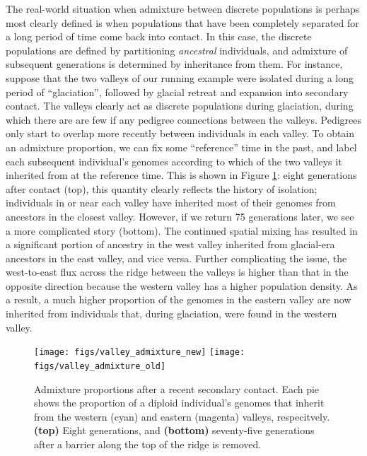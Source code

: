 \documentclass{ar-1col}
\begin{document}
The real-world situation when admixture between discrete populations 
is perhaps most clearly defined is when populations that have been completely separated
for a long period of time come back into contact.
In this case, the discrete populations are defined by partitioning \emph{ancestral} individuals,
and admixture of subsequent generations is determined by inheritance from them.
For instance, suppose that 
the two valleys of our running example
were isolated during a long period of ``glaciation'',
followed by glacial retreat and expansion into secondary contact.
The valleys clearly act as discrete populations during glaciation, 
during which there are are few if any pedigree connections between the valleys.
Pedigrees only start to overlap more recently between individuals in each valley.
To obtain an admixture proportion,
we can fix some ``reference'' time in the past,
and label each subsequent individual's genomes
according to which of the two valleys it inherited from at the reference time.
This is shown in Figure \ref{postglacial_expansion}:
eight generations after contact (top),
this quantity clearly reflects the history of isolation;  
individuals in or near each valley have inherited most of their genomes 
from ancestors in the closest valley.
However, if we return 75 generations later, 
we see a more complicated story (bottom).
The continued spatial mixing has resulted in a significant 
portion of ancestry in the west valley inherited from 
glacial-era ancestors in the east valley, 
and vice versa.
Further complicating the issue, 
the west-to-east flux across the ridge between the valleys 
is higher than that in the opposite direction 
because the western valley has a higher population density. 
As a result, a much higher proportion of the genomes
in the eastern valley are now inherited 
from individuals that, 
during glaciation, were found in the western valley.

\begin{figure}	%
    \centering
        \texttt{[image: figs/valley\_admixture\_new]}
        \texttt{[image: figs/valley\_admixture\_old]}
        \caption{
            Admixture proportions after a recent secondary contact.
            Each pie shows the proportion of a diploid individual's genomes
            that inherit from the western (cyan) and eastern (magenta) valleys, respecitvely.
            \textbf{(top)} Eight generations, and
            \textbf{(bottom)} seventy-five generations 
            after a barrier along the top of the ridge is removed.
        }
        \label{postglacial_expansion}
\end{figure}
\end{document}
